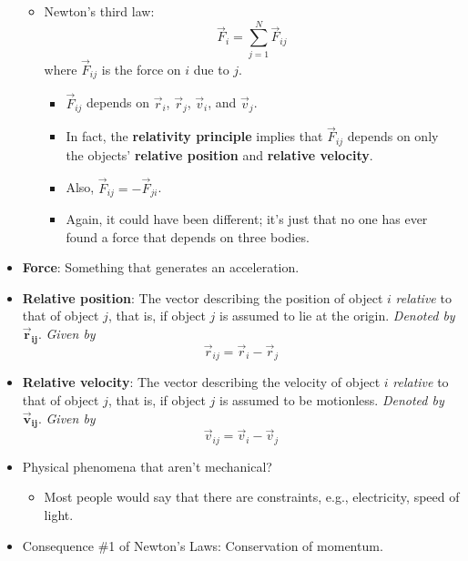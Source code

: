 \documentclass[../notes.tex]{subfiles}
\begin{document}
\begin{itemize}
\begin{itemize}
        \item Newton's third law:
        \begin{equation*}
            \vec{F}_i = \sum_{j=1}^N\vec{F}_{ij}
        \end{equation*}
        where $\vec{F}_{ij}$ is the force on $i$ due to $j$.
        \begin{itemize}
            \item $\vec{F}_{ij}$ depends on $\vec{r}_i$, $\vec{r}_j$, $\vec{v}_i$, and $\vec{v}_j$.
            \item In fact, the \textbf{relativity principle} implies that $\vec{F}_{ij}$ depends on only the objects' \textbf{relative position} and \textbf{relative velocity}.
            \item Also, $\vec{F}_{ij}=-\vec{F}_{ji}$.
            \item Again, it could have been different; it's just that no one has ever found a force that depends on three bodies.
        \end{itemize}
    \end{itemize}
    \item \textbf{Force}: Something that generates an acceleration.
    \item \textbf{Relative position}: The vector describing the position of object $i$ \emph{relative} to that of object $j$, that is, if object $j$ is assumed to lie at the origin. \emph{Denoted by} $\bm{\vec{r}_{ij}}$. \emph{Given by}
    \begin{equation*}
        \vec{r}_{ij} = \vec{r}_i-\vec{r}_j
    \end{equation*}
    \item \textbf{Relative velocity}: The vector describing the velocity of object $i$ \emph{relative} to that of object $j$, that is, if object $j$ is assumed to be motionless. \emph{Denoted by} $\bm{\vec{v}_{ij}}$. \emph{Given by}
    \begin{equation*}
        \vec{v}_{ij} = \vec{v}_i-\vec{v}_j
    \end{equation*}
    \item Physical phenomena that aren't mechanical?
    \begin{itemize}
        \item Most people would say that there are constraints, e.g., electricity, speed of light.
    \end{itemize}
    \item Consequence \#1 of Newton's Laws: Conservation of momentum.
    \begin{itemize}

\end{itemize}
\end{itemize}
\end{document}
